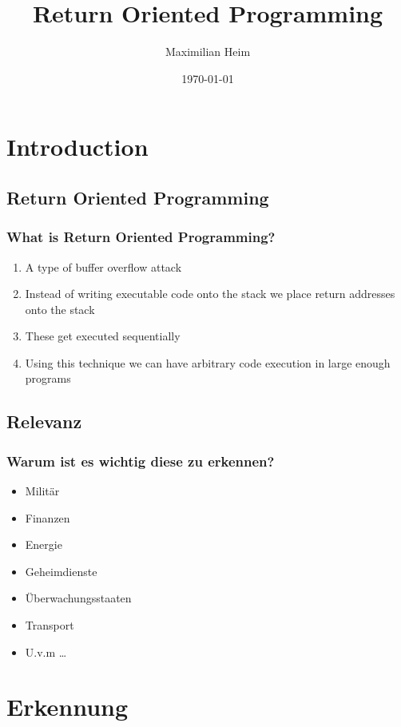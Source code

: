 \documentclass[11pt]{beamer}
\author{Maximilian Heim}
\title{Return Oriented Programming}
\institute{University Albstadt-Sigmaringen}
\date{\today}
\begin{document}
\begin{frame}
\titlepage
\end{frame}

\begin{frame}
\tableofcontents
\end{frame}

\section{Introduction}
\subsection{Return Oriented Programming}
\begin{frame}
    \frametitle{What is Return Oriented Programming?}
    \begin{enumerate}
    \item A type of buffer overflow attack
    \item Instead of writing executable code onto the stack we place return addresses onto the stack
    \item These get executed sequentially
    \item Using this technique we can have arbitrary code execution in large enough programs
    \end{enumerate}
\end{frame}
\subsection{Relevanz}
\begin{frame}
    \frametitle{Warum ist es wichtig diese zu erkennen?}
    \begin{itemize}
    \item Militär
    \item Finanzen
    \item Energie
    \item Geheimdienste
    \item Überwachungsstaaten
    \item Transport
    \item U.v.m \ldots
    \end{itemize}

\end{frame}


\section{Erkennung}
\end{document}
